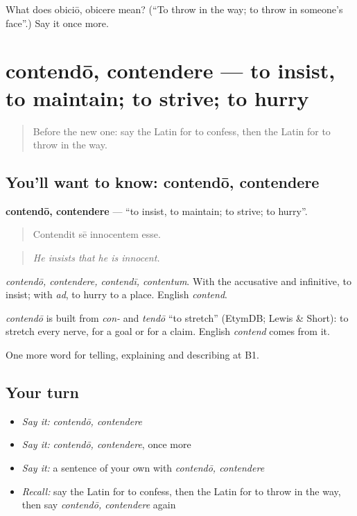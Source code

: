 \begin{tcolorbox}[breakable,colback=teal!4,colframe=teal!35!black,title={Before you move on}]
What does obiciō, obicere mean? (\textquotedblleft{}To throw in the way; to throw in someone's face\textquotedblright{}.) Say it once more.
\end{tcolorbox}
\section[contendō, contendere]{contendō, contendere — to insist, to maintain; to strive; to hurry}

\label{lesson:LA-C363-contendo}



\begin{quote}
Before the new one: say the Latin for to confess, then the Latin for to throw in the way.
\end{quote}

\subsection*{You'll want to know: contendō, contendere}
\textbf{contendō, contendere} — \textquotedblleft{}to insist, to maintain; to strive; to hurry\textquotedblright{}.

\begin{quote}
Contendit sē innocentem esse.
\end{quote}

\begin{quote}
\emph{He insists that he is innocent.}
\end{quote}

\emph{contendō, contendere, contendī, contentum}. With the accusative and infinitive, to insist; with \emph{ad}, to hurry to a place. English \emph{contend}.

\begin{cousinweb}
\emph{contendō} is built from \emph{con-} and \emph{tendō} \textquotedblleft{}to stretch\textquotedblright{} (EtymDB; Lewis \& Short): to stretch every nerve, for a goal or for a claim. English \emph{contend} comes from it.
\end{cousinweb}

\begin{grammarlens}[title={What you've built}]
One more word for telling, explaining and describing at B1.
\end{grammarlens}

\subsection*{Your turn}
\begin{itemize}
\raggedright
  \item \emph{Say it:} \emph{contendō, contendere}
  \item \emph{Say it:} \emph{contendō, contendere}, once more
  \item \emph{Say it:} a sentence of your own with \emph{contendō, contendere}
  \item \emph{Recall:} say the Latin for to confess, then the Latin for to throw in the way, then say \emph{contendō, contendere} again
\end{itemize}

